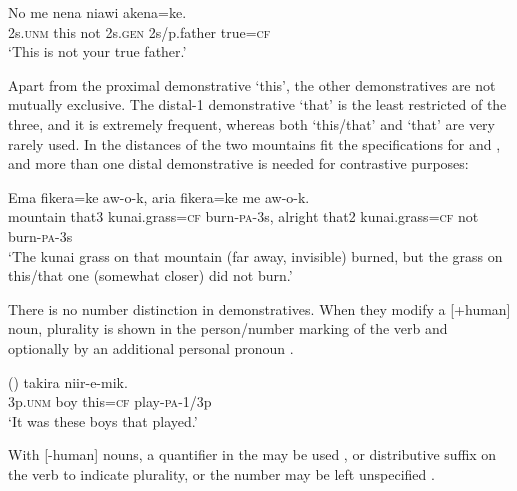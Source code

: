 \ea%
\label{ex:3:x633}
\gll No{\upshape\footnotemark}  me nena niawi akena=ke. \\
2s.\textsc{unm} this not 2s.\textsc{gen} 2s/p.father true=\textsc{cf}\\
\glt`This is not your true father.'
\z


Apart from the proximal demonstrative  `this', the other demonstratives are not mutually exclusive. The distal-1 demonstrative  `that' is the least restricted of the three, and it is extremely frequent, whereas both  `this/that' and  `that' are very rarely used. In  the distances of the two mountains fit the specifications for  and  , and more than one distal demonstrative is needed for contrastive purposes:

\ea%
\label{ex:3:x1749}
\gll Ema  fikera=ke aw-o-k, aria  fikera=ke me aw-o-k.\\
mountain that3 kunai.grass=\textsc{cf} burn-\textsc{pa}-3s, alright that2 kunai.grass=\textsc{cf} not burn-\textsc{pa}-3s\\
\glt`The kunai grass on that mountain (far away, invisible) burned, but the grass on this/that one (somewhat closer) did not burn.'
\z

There is no number distinction in demonstratives. When they modify a [+human] noun, plurality is shown in the person/number marking of the verb and optionally by an additional personal pronoun .

\ea%
\label{ex:3:x635}
\gll () takira  niir-e-mik. \\
3p.\textsc{unm} boy this=\textsc{cf} play-\textsc{pa}-1/3p\\
\glt`It was these boys that played.'
\z

With [-human] nouns, a quantifier in the  may be used , or distributive suffix on the verb  to indicate plurality, or the number may be left unspecified .

